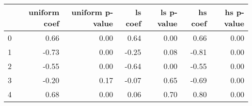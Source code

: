 \begin{tabular}{lrrrrrr}
\toprule
 & uniform coef & uniform p-value & ls coef & ls p-value & hs coef & hs p-value \\
\midrule
0 & 0.66 & 0.00 & 0.64 & 0.00 & 0.66 & 0.00 \\
1 & -0.73 & 0.00 & -0.25 & 0.08 & -0.81 & 0.00 \\
2 & -0.55 & 0.00 & -0.64 & 0.00 & -0.55 & 0.00 \\
3 & -0.20 & 0.17 & -0.07 & 0.65 & -0.69 & 0.00 \\
4 & 0.68 & 0.00 & 0.06 & 0.70 & 0.80 & 0.00 \\
\bottomrule
\end{tabular}
